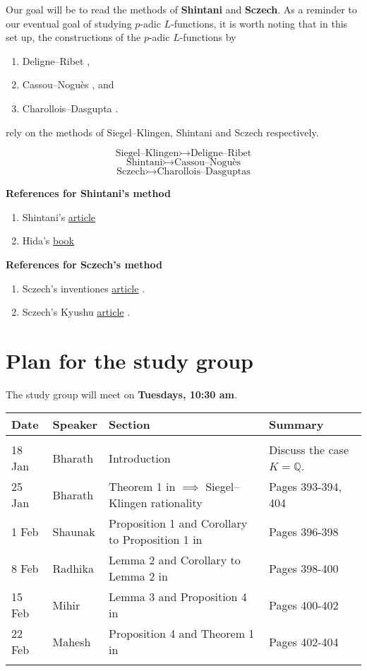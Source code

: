 \documentclass[11pt,a4paper,notitlepage]{article}
\begin{document}
Our goal will be to read the methods of \textbf{Shintani} and \textbf{Sczech}. As a reminder to our eventual goal of studying $p$-adic $L$-functions, it is worth noting that in this set up, the  constructions of the $p$-adic $L$-functions by 
\begin{enumerate}
\item Deligne--Ribet \cite{MR579702},
\item Cassou--Nogu\`es \cite{MR522119,MR524276}, and
\item Charollois--Dasgupta \cite{MR3272012}.
\end{enumerate}

rely on the methods of Siegel--Klingen, Shintani and Sczech respectively. 

\[\text{Siegel--Klingen} \rightarrowtail \text{Deligne--Ribet}\]
\[\text{Shintani} \rightarrowtail \text{Cassou--Nogu\`es}\]
\[\text{Sczech} \rightarrowtail \text{Charollois--Dasguptas}\]

\textbf{References for Shintani's method}
\begin{enumerate}
\item Shintani's \href{shintani-evaluation.pdf}{article} \cite{MR427231}	
\item Hida's \href{hida-elementary.pdf}{book} 	\cite{MR1216135}
\end{enumerate}

\textbf{References for Sczech's method}
\begin{enumerate}
\item Sczech's inventiones \href{sczech-eisenstein.pdf}{article}	 \cite{MR1231838}.
\item Sczech's Kyushu \href{sczech-kyushu.pdf}{article} \cite{MR1467997}.
\end{enumerate}


\section{Plan for the study group}
The study group will meet on \textbf{Tuesdays, 10:30 am}.
\begin{center}
\begin{tabularx}{\textwidth}{p{5cm}p{5cm}p{5cm}p{5cm}}
\toprule  
Date & Speaker & Section  & Summary  \\ 
\midrule \\
18 Jan & Bharath & Introduction  & Discuss the case $K=\mathbb{Q}$. \\
25 Jan & Bharath & Theorem 1 in \cite{MR427231}  $\implies$ Siegel--Klingen rationality & Pages 393-394, 404 \\
1 Feb & Shaunak & Proposition 1 and Corollary to Proposition 1 in \cite{MR427231} & Pages 396-398 \\
8 Feb & Radhika & Lemma 2 and Corollary to Lemma 2 in \cite{MR427231}	& Pages 398-400 \\
15 Feb & Mihir  & Lemma 3 and Proposition 4	 in \cite{MR427231} & Pages 400-402 \\
22 Feb & Mahesh & Proposition 4 and Theorem 1 in  \cite{MR427231} & Pages 402-404 \\
\bottomrule \\
\end{tabularx}
\end{center}
	
	
	
\end{document}
